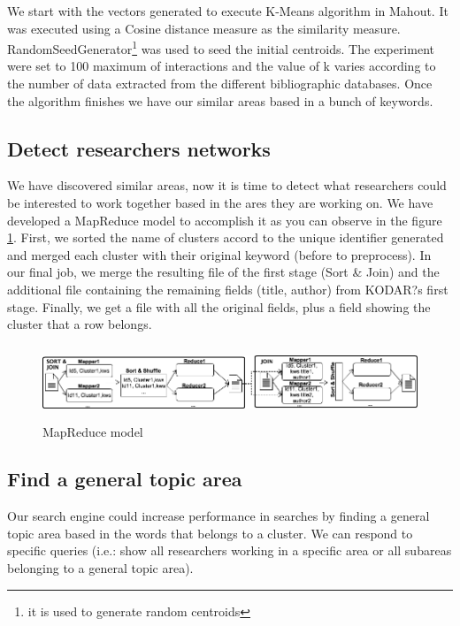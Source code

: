 \documentclass[11pt]{article}
\begin{document}
We start with the vectors generated to execute K-Means algorithm in Mahout. It was executed using a Cosine distance measure as the similarity measure. RandomSeedGenerator\footnote{it is used to generate random centroids} was used to seed the initial centroids. The experiment were set to 100 maximum of interactions and the value of k varies according to the number of data extracted from the different bibliographic databases. Once the algorithm finishes we have our similar areas based in a bunch of keywords.


\subsection{Detect researchers networks}

We have discovered similar areas, now it is time to detect what researchers could be interested to work together based in the ares they are working on. We have developed a MapReduce model to accomplish it as you can observe in the figure \ref{fig:Escudo2}. First, we sorted the name of clusters accord to the unique identifier generated and merged each cluster with their original keyword (before to preprocess). In our final job, we merge the resulting file of the first stage (Sort \& Join) and the additional file containing the remaining fields (title, author) from KODAR?s first stage. Finally, we get a file with all the original fields, plus a field showing the cluster that a row belongs.

\begin{figure}[ht!]
	\centering
		\includegraphics[height=2.2cm]{findka.png}
	\caption{MapReduce model}
	\label{fig:Escudo2}
\end{figure}

\subsection{Find a general topic area}

Our search engine could increase performance in searches by finding a general topic area based in the words that belongs to a cluster. We can respond to specific queries (i.e.: show all researchers working in a specific area or all subareas belonging to a general topic area).
\end{document}
